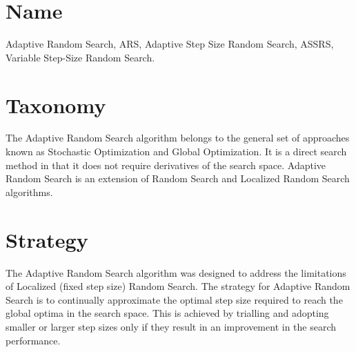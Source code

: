 \documentclass[a4paper, 11pt]{article}
\begin{document}
\section{Name} 
\label{sec:name}
Adaptive Random Search, ARS, Adaptive Step Size Random Search, ASSRS, Variable Step-Size Random Search.

\section{Taxonomy}
\label{sec:taxonomy}
The Adaptive Random Search algorithm belongs to the general set of approaches known as Stochastic Optimization and Global Optimization. It is a direct search method in that it does not require derivatives of the search space.
Adaptive Random Search is an extension of Random Search and Localized Random Search algorithms.

\section{Strategy}
\label{sec:strategy}
The Adaptive Random Search algorithm was designed to address the limitations of Localized (fixed step size) Random Search. The strategy for Adaptive Random Search is to continually approximate the optimal step size required to reach the global optima in the search space. This is achieved by trialling and adopting smaller or larger step sizes only if they result in an improvement in the search performance.
\end{document}
